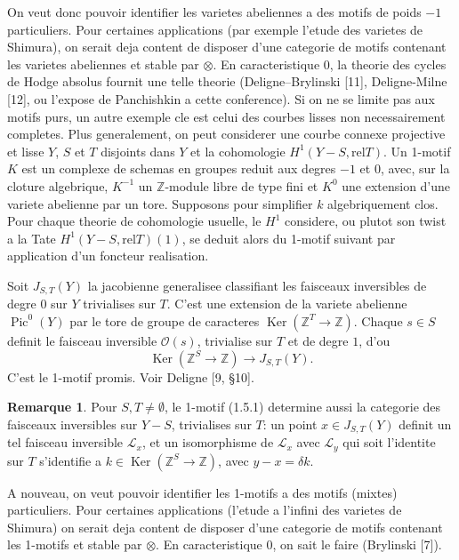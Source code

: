 \documentclass[11pt,a4paper]{article}
\theoremstyle{plain}
\theoremstyle{definition}
\newtheorem{remark}[theorem]{Remarque}
\DeclareMathOperator{\Ker}{Ker}
\DeclareMathOperator{\Pic}{Pic}
\newcommand{\Z}{\mathbb{Z}}
\newcommand{\rel}{\mathrm{rel}}
\begin{document}
On veut donc pouvoir identifier les varietes abeliennes a des motifs de poids $-1$ particuliers. Pour certaines applications (par exemple l'etude des varietes de Shimura), on serait deja content de disposer d'une categorie de motifs contenant les varietes abeliennes et stable par $\otimes$. En caracteristique $0$, la theorie des cycles de Hodge absolus fournit une telle theorie (Deligne--Brylinski [11], Deligne-Milne [12], ou l'expose de Panchishkin a cette conference). Si on ne se limite pas aux motifs purs, un autre exemple cle est celui des courbes lisses non necessairement completes. Plus generalement, on peut considerer une courbe connexe projective et lisse $Y$, $S$ et $T$ disjoints dans $Y$ et la cohomologie $H^1(Y - S, \rel T)$. Un 1-motif $K$ est un complexe de schemas en groupes reduit aux degres $-1$ et $0$, avec, sur la cloture algebrique, $K^{-1}$ un $\Z$-module libre de type fini et $K^0$ une extension d'une variete abelienne par un tore. Supposons pour simplifier $k$ algebriquement clos. Pour chaque theorie de cohomologie usuelle, le $H^1$ considere, ou plutot son twist a la Tate $H^1(Y - S, \rel T)(1)$, se deduit alors du 1-motif suivant par application d'un foncteur realisation.

Soit $J_{S,T}(Y)$ la jacobienne generalisee classifiant les faisceaux inversibles de degre $0$ sur $Y$ trivialises sur $T$. C'est une extension de la variete abelienne $\Pic^0(Y)$ par le tore de groupe de caracteres $\Ker(\Z^T \to \Z)$. Chaque $s \in S$ definit le faisceau inversible $\mathcal{O}(s)$, trivialise sur $T$ et de degre $1$, d'ou
\begin{equation}
\Ker(\Z^S \to \Z) \to J_{S,T}(Y).
\tag{1.5.1}
\end{equation}
C'est le 1-motif promis. Voir Deligne [9, \S10].

\begin{remark}
Pour $S, T \neq \emptyset$, le 1-motif (1.5.1) determine aussi la categorie des faisceaux inversibles sur $Y - S$, trivialises sur $T$: un point $x \in J_{S,T}(Y)$ definit un tel faisceau inversible $\mathcal{L}_x$, et un isomorphisme de $\mathcal{L}_x$ avec $\mathcal{L}_y$ qui soit l'identite sur $T$ s'identifie a $k \in \Ker(\Z^S \to \Z)$, avec $y - x = \delta k$.
\end{remark}

A nouveau, on veut pouvoir identifier les 1-motifs a des motifs (mixtes) particuliers. Pour certaines applications (l'etude a l'infini des varietes de Shimura) on serait deja content de disposer d'une categorie de motifs contenant les 1-motifs et stable par $\otimes$. En caracteristique $0$, on sait le faire (Brylinski [7]).
\end{document}
